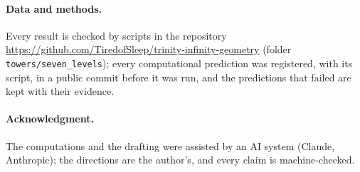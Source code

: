 \documentclass[11pt]{article}
\theoremstyle{remark}
\begin{document}
\paragraph{Data and methods.} Every result is checked by scripts in the repository
\url{https://github.com/TiredofSleep/trinity-infinity-geometry} (folder \texttt{towers/seven\_levels}); every
computational prediction was registered, with its script, in a public commit before it was run, and the predictions
that failed are kept with their evidence.

\paragraph{Acknowledgment.} The computations and the drafting were assisted by an AI system (Claude, Anthropic); the
directions are the author's, and every claim is machine-checked.
\end{document}
